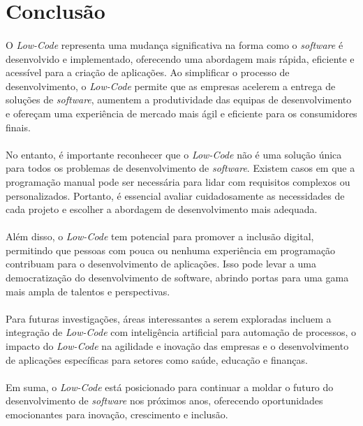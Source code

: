 \documentclass[pdflatex,sn-mathphys-num]{sn-jnl}
\theoremstyle{thmstyleone}
\theoremstyle{thmstyletwo}
\theoremstyle{thmstylethree}
\begin{document}
\section{Conclusão}\label{sec8}

\paragraph{}O \textit{Low-Code} representa uma mudança significativa na forma como o \textit{software} é desenvolvido e implementado, oferecendo uma abordagem mais rápida, eficiente e acessível para a criação de aplicações. Ao simplificar o processo de desenvolvimento, o \textit{Low-Code} permite que as empresas acelerem a entrega de soluções de \textit{software}, aumentem a produtividade das equipas de desenvolvimento e ofereçam uma experiência de mercado mais ágil e eficiente para os consumidores finais.

\paragraph{}No entanto, é importante reconhecer que o \textit{Low-Code} não é uma solução única para todos os problemas de desenvolvimento de \textit{software}. Existem casos em que a programação manual pode ser necessária para lidar com requisitos complexos ou personalizados. Portanto, é essencial avaliar cuidadosamente as necessidades de cada projeto e escolher a abordagem de desenvolvimento mais adequada.

\paragraph{}Além disso, o \textit{Low-Code} tem potencial para promover a inclusão digital, permitindo que pessoas com pouca ou nenhuma experiência em programação contribuam para o desenvolvimento de aplicações. Isso pode levar a uma democratização do desenvolvimento de software, abrindo portas para uma gama mais ampla de talentos e perspectivas.

\paragraph{}Para futuras investigações, áreas interessantes a serem exploradas incluem a integração de \textit{Low-Code} com inteligência artificial para automação de processos, o impacto do \textit{Low-Code} na agilidade e inovação das empresas e o desenvolvimento de aplicações específicas para setores como saúde, educação e finanças.

\paragraph{}Em suma, o \textit{Low-Code} está posicionado para continuar a moldar o futuro do desenvolvimento de \textit{software} nos próximos anos, oferecendo oportunidades emocionantes para inovação, crescimento e inclusão.


\newpage


\end{document}
